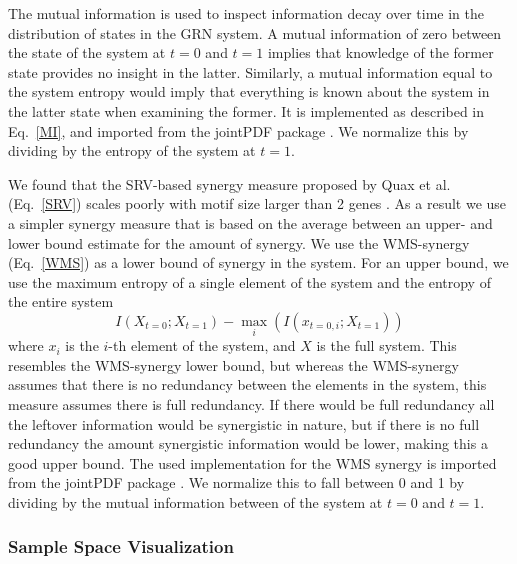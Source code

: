 \documentclass[../main.tex]{subfiles}
\begin{document}
The mutual information is used to inspect information decay over time in the distribution of states in the GRN system.
A mutual information of zero between the state of the system at $t=0$ and $t=1$ implies that knowledge of the former state provides no insight in the latter.
Similarly, a mutual information equal to the system entropy would imply that everything is known about the system in the latter state when examining the former.
It is implemented as described in Eq.~\ref{MI}, and imported from the jointPDF package \cite{jointpdf}.
We normalize this by dividing by the entropy of the system at $t = 1$.

We found that the SRV-based synergy measure proposed by Quax et al. (Eq.~\ref{SRV}) scales poorly with motif size larger than 2 genes \cite{quax2017quantifying}.
As a result we use a simpler synergy measure that is based on the average between an upper- and lower bound estimate for the amount of synergy.
We use the WMS-synergy (Eq.~\ref{WMS}) as a lower bound of synergy in the system.
For an upper bound, we use the maximum entropy of a single element of the system and the entropy of the entire system
%
\begin{equation}
I(X_{t=0}; X_{t=1}) - \max_i (I(x_{t=0,i};X_{t=1}))
\end{equation}
%
where $x_i$ is the $i$-th element of the system, and $X$ is the full system.
This resembles the WMS-synergy lower bound, but whereas the WMS-synergy assumes that there is no redundancy between the elements in the system, this measure assumes there is full redundancy.
If there would be full redundancy all the leftover information would be synergistic in nature, but if there is no full redundancy the amount synergistic information would be lower, making this a good upper bound.
The used implementation for the WMS synergy is imported from the jointPDF package \cite{jointpdf}.
We normalize this to fall between 0 and 1 by dividing by the mutual information between of the system at $t = 0$ and $t = 1$.

\subsubsection{Sample Space Visualization}
\end{document}
